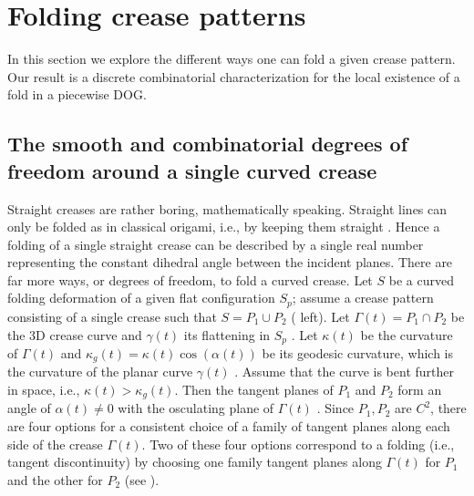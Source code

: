 
\section{Folding crease patterns} \label{sec:folding}
In this section we explore the different ways one can fold a given crease pattern. Our result is a discrete combinatorial characterization for the local existence of a fold in a piecewise DOG.

\subsection{The smooth and combinatorial degrees of freedom around a single curved crease}
Straight creases are rather boring, mathematically speaking. Straight lines can only be folded as in classical origami, i.e., by keeping them straight \cite{demaine_lens}.  Hence a folding of a single straight crease can be described by a single real number representing the constant dihedral angle between the incident planes. There are far more ways, or degrees of freedom, to fold a curved crease. Let $S$ be a curved folding  deformation of a given flat configuration $S_p$; assume a crease pattern consisting of a single crease such that $S = P_1 \cup P_2$ ( left). Let $\Gamma(t) = P_1 \cap P_2$ be the 3D crease curve and $\gamma(t)$ its flattening in $S_p$ . Let $\kappa(t)$ be the curvature of $\Gamma(t)$ and $\kappa_g(t) = \kappa(t) \cos(\alpha(t))$ be its geodesic curvature,  which is the curvature of the planar curve $\gamma(t)$ . Assume that the curve is  bent further in space, i.e., $\kappa(t) > \kappa_g(t)$. Then the tangent planes of $P_1$ and $P_2$ form an angle of $\alpha(t) \neq 0$  with the osculating plane of $\Gamma(t)$ \cite{more_on_paper,duncan_folded}. Since $P_1,P_2$ are $C^2$,  there are four options for a consistent choice of a family of tangent planes along each side of the crease $\Gamma(t)$. Two of these four options correspond to a folding (i.e., tangent discontinuity) by choosing one family tangent planes along $\Gamma(t)$ for $P_1$ and the other for $P_2$ (see ).
